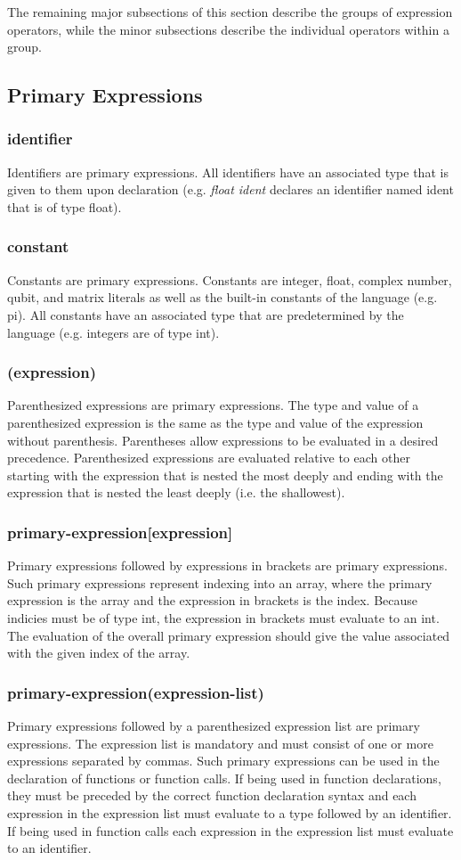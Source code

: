 
The remaining major subsections of this section describe the groups of expression operators, while the minor subsections describe the individual operators within a group.
\subsection{Primary Expressions}
\subsubsection{identifier}
Identifiers are primary expressions. All identifiers have an associated type that is given to them upon declaration (e.g. \textit{float ident} declares an identifier named ident that is of type float).
\subsubsection{constant}
Constants are primary expressions. Constants are integer, float, complex number, qubit, and matrix literals as well as the built-in constants of the language (e.g. pi). All constants have an associated type that are predetermined by the language (e.g. integers are of type int). 
\subsubsection{(expression)}
Parenthesized expressions are primary expressions. The type and value of a parenthesized expression is the same as the type and value of the expression without parenthesis. Parentheses allow expressions to be evaluated in a desired precedence. Parenthesized expressions are evaluated relative to each other starting with the expression that is nested the most deeply and ending with the expression that is nested the least deeply (i.e. the shallowest).
\subsubsection{primary-expression[expression]}
Primary expressions followed by expressions in brackets are primary expressions. Such primary expressions represent indexing into an array, where the primary expression is the array and the expression in brackets is the index. Because indicies must be of type int, the expression in brackets must evaluate to an int. The evaluation of the overall primary expression should give the value associated with the given index of the array.
\subsubsection{primary-expression(expression-list)}
Primary expressions followed by a parenthesized expression list are primary expressions. The expression list is mandatory and must consist of one or more expressions separated by commas. Such primary expressions can be used in the declaration of functions or function calls. If being used in function declarations, they must be preceded by the correct function declaration syntax and each expression in the expression list must evaluate to a type followed by an identifier. If being used in function calls each expression in the expression list must evaluate to an identifier.
